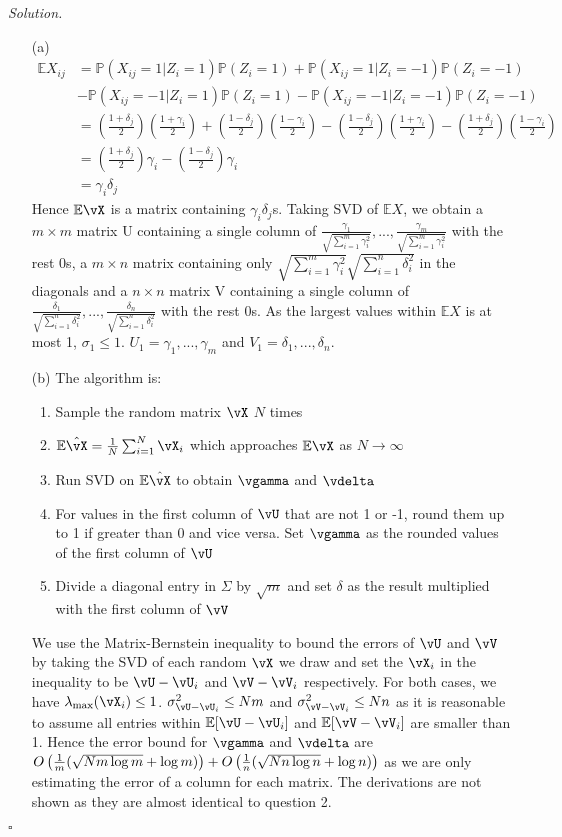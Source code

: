 \documentclass[11pt]{article}
\newcommand{\E}{\ensuremath{\mathbb{E}}} %
\renewcommand{\P}{\ensuremath{\mathbb{P}}} %
\theoremstyle{definition}
\newenvironment{solution}{\noindent\emph{Solution.}}{\hfill$\square$}
\begin{document}
\begin{solution}
  \
  \begin{enumerate}
    \item[(a)]
\begin{align*}
\E X_{ij} 
&= \P(X_{ij} = 1 | Z_i = 1)\P(Z_i = 1) + \P(X_{ij} = 1 | Z_i = -1)\P(Z_i = -1)\\
&- \P(X_{ij} = -1 | Z_i = 1)\P(Z_i = 1) - \P(X_{ij} = -1 | Z_i = -1)\P(Z_i = -1)\\
&= (\frac{1 + \delta_j}{2})(\frac{1 + \gamma_i}{2}) + (\frac{1 - \delta_j}{2})(\frac{1 - \gamma_i}{2}) - (\frac{1 - \delta_j}{2})(\frac{1 + \gamma_i}{2}) - (\frac{1 + \delta_j}{2})(\frac{1 - \gamma_i}{2})\\
&= (\frac{1 + \delta_j}{2})\gamma_i - (\frac{1 - \delta_j}{2})\gamma_i\\
&= \gamma_i \delta_j
\end{align*}
Hence $\E \vX$ is a matrix containing $\gamma_i \delta_j$s. Taking SVD of $\E X$, we obtain a $m \times m$ matrix U containing a single column of $\frac{\gamma_1}{\sqrt{{\sum_{i=1}^m \gamma_i^2}}}, ..., \frac{\gamma_m}{\sqrt{{\sum_{i=1}^m \gamma_i^2}}}$ with the rest 0s, a $m \times n$ matrix containing only $\sqrt{{\sum_{i=1}^m \gamma_i^2}}\sqrt{{\sum_{i=1}^n \delta_i^2}}$ in the diagonals and a $n \times n$ matrix V containing a single column of $\frac{\delta_1}{\sqrt{{\sum_{i=1}^n \delta_i^2}}}, ..., \frac{\delta_n}{\sqrt{{\sum_{i=1}^n \delta_i^2}}}$ with the rest 0s. As the largest values within $\E X$ is at most 1, $\sigma_1 \leq 1$. $U_1 = \gamma_1, ..., \gamma_m$ and $V_1 = \delta_1, ..., \delta_n$.
\newpage
    \item[(b)]
The algorithm is:
\begin{enumerate}
\item Sample the random matrix $\vX$ $N$ times
\item $\E \hat{\vX} = \frac{1}{N} \sum_{i=1}^{N} \vX_i$ which approaches $\E \vX$ as $N \rightarrow \infty$
\item Run SVD on $\E \hat{\vX}$ to obtain $\vgamma$ and $\vdelta$
\item For values in the first column of $\vU$ that are not 1 or -1, round them up to 1 if greater than 0 and vice versa. Set $\vgamma$ as the rounded values of the first column of $\vU$
\item Divide a diagonal entry in $\Sigma$ by $\sqrt{m}$ and set $\delta$ as the result multiplied with the first column of $\vV$
\end{enumerate}
We use the Matrix-Bernstein inequality to bound the errors of $\vU$ and $\vV$ by taking the SVD of each random $\vX$ we draw and set the $\vX_i$ in the inequality to be $\vU - \vU_i$ and $\vV - \vV_i$ respectively. For both cases, we have $\lambda_{\max}(\vX_i) \leq 1$. $\sigma^2_{\vU - \vU_i} \leq Nm$ and $\sigma^2_{\vV - \vV_i} \leq Nn$ as it is reasonable to assume all entries within $\E[\vU - \vU_i]$ and $\E[\vV - \vV_i]$ are smaller than 1. Hence the error bound for $\vgamma$ and $\vdelta$ are $ O\del{\frac{1}{m} (\sqrt{Nm\log m} + \log m)} + O\del{\frac{1}{n}(\sqrt{Nn\log n} + \log n)}$ as we are only estimating the error of a column for each matrix. The derivations are not shown as they are almost identical to question 2.

\end{enumerate}
\end{solution}
\end{document}
